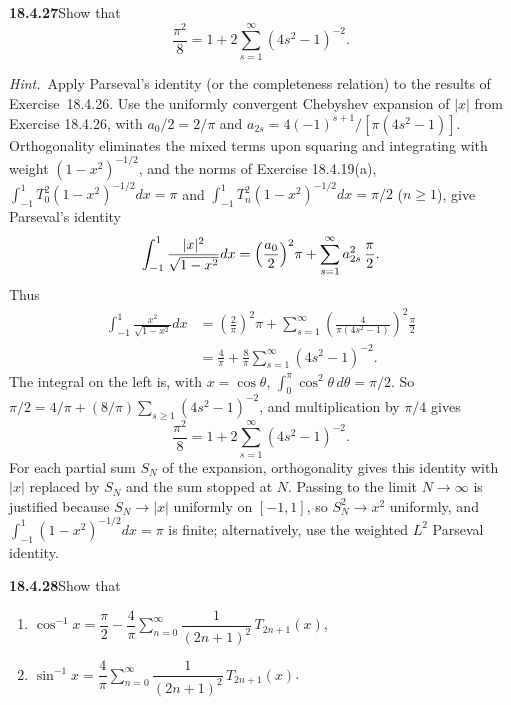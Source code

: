 \par\bigskip
\noindent\textbf{18.4.27}\quad Show that
\[
\frac{\pi^{2}}{8}=1+2\sum_{s=1}^{\infty}(4s^{2}-1)^{-2}.
\]
\par\emph{Hint.}~Apply Parseval's identity (or the completeness
relation) to the results of Exercise~18.4.26.
\solution
Use the uniformly convergent Chebyshev expansion of $|x|$ from
Exercise 18.4.26, with $a_0/2=2/\pi$ and
$a_{2s}=4(-1)^{s+1}/[\pi(4s^2-1)]$.  Orthogonality eliminates the
mixed terms upon squaring and integrating with weight
$(1-x^2)^{-1/2}$, and the norms of Exercise 18.4.19(a),
$\int_{-1}^1T_0^2(1-x^2)^{-1/2}dx=\pi$ and
$\int_{-1}^1T_n^2(1-x^2)^{-1/2}dx=\pi/2$ ($n\ge1$), give Parseval's
identity
\[
\int_{-1}^1\frac{|x|^2}{\sqrt{1-x^2}}dx
 =\Bigl(\frac{a_0}2\Bigr)^2\pi+\sum_{s=1}^\infty a_{2s}^2\,\frac\pi2.
\]
Thus
\begin{align*}
\int_{-1}^1\frac{x^2}{\sqrt{1-x^2}}dx
 &=\left(\frac2\pi\right)^2\pi
   +\sum_{s=1}^\infty
       \left(\frac4{\pi(4s^2-1)}\right)^2\frac\pi2\\
 &=\frac4\pi+\frac8\pi\sum_{s=1}^\infty(4s^2-1)^{-2}.
\end{align*}
The integral on the left is, with $x=\cos\theta$,
$\int_0^\pi\cos^2\theta\,d\theta=\pi/2$.  So
$\pi/2=4/\pi+(8/\pi)\sum_{s\ge1}(4s^2-1)^{-2}$, and multiplication
by $\pi/4$ gives
\[
\boxed{\frac{\pi^2}{8}=1+2\sum_{s=1}^\infty(4s^2-1)^{-2}}.
\]
For each partial sum $S_N$ of the expansion, orthogonality gives this
identity with $|x|$ replaced by $S_N$ and the sum stopped at $N$.
Passing to the limit $N\to\infty$ is justified because $S_N\to|x|$
uniformly on $[-1,1]$, so $S_N^2\to x^2$ uniformly, and
$\int_{-1}^1(1-x^2)^{-1/2}dx=\pi$ is finite; alternatively, use the
weighted $L^2$ Parseval identity.

\par\bigskip
\noindent\textbf{18.4.28}\quad Show that
\begin{enumerate}
\item[(a)] $\cos^{-1}x=\dfrac{\pi}{2}
-\dfrac{4}{\pi}\displaystyle\sum_{n=0}^{\infty}
\dfrac{1}{(2n+1)^{2}}\,T_{2n+1}(x)$,
\item[(b)] $\sin^{-1}x=\dfrac{4}{\pi}
\displaystyle\sum_{n=0}^{\infty}\dfrac{1}{(2n+1)^{2}}\,T_{2n+1}(x)$.
\end{enumerate}
\par\nobreak
\solution
{}\par

